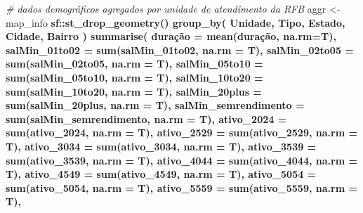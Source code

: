 \documentclass[]{article}
\newenvironment{Shaded}{\begin{snugshade}}{\end{snugshade}}
\newcommand{\CommentTok}[1]{\textcolor[rgb]{0.56,0.35,0.01}{\textit{#1}}}
\newcommand{\DataTypeTok}[1]{\textcolor[rgb]{0.13,0.29,0.53}{#1}}
\newcommand{\DecValTok}[1]{\textcolor[rgb]{0.00,0.00,0.81}{#1}}
\newcommand{\KeywordTok}[1]{\textcolor[rgb]{0.13,0.29,0.53}{\textbf{#1}}}
\newcommand{\NormalTok}[1]{#1}
\newcommand{\OperatorTok}[1]{\textcolor[rgb]{0.81,0.36,0.00}{\textbf{#1}}}
\newcommand{\StringTok}[1]{\textcolor[rgb]{0.31,0.60,0.02}{#1}}
\begin{document}
\begin{Shaded}
\begin{Highlighting}[]
\CommentTok{# dados demográficos agregados por unidade de atendimento da RFB }
\NormalTok{aggr <-}\StringTok{ }\NormalTok{map_info }\OperatorTok{%
\StringTok{          }\NormalTok{sf}\OperatorTok{::}\KeywordTok{st_drop_geometry}\NormalTok{() }\OperatorTok{%
\StringTok{          }\KeywordTok{group_by}\NormalTok{(}
\NormalTok{            Unidade, Tipo, Estado, Cidade, Bairro}
\NormalTok{          ) }\OperatorTok{%
\StringTok{          }\KeywordTok{summarise}\NormalTok{(}
\NormalTok{            duraçã}\DataTypeTok{o =} \KeywordTok{mean}\NormalTok{(duração, }\DataTypeTok{na.rm=}\NormalTok{T),}
            \DataTypeTok{salMin_01to02 =} \KeywordTok{sum}\NormalTok{(salMin_01to02, }\DataTypeTok{na.rm =}\NormalTok{ T),}
            \DataTypeTok{salMin_02to05 =} \KeywordTok{sum}\NormalTok{(salMin_02to05, }\DataTypeTok{na.rm =}\NormalTok{ T),}
            \DataTypeTok{salMin_05to10 =} \KeywordTok{sum}\NormalTok{(salMin_05to10, }\DataTypeTok{na.rm =}\NormalTok{ T),}
            \DataTypeTok{salMin_10to20 =} \KeywordTok{sum}\NormalTok{(salMin_10to20, }\DataTypeTok{na.rm =}\NormalTok{ T),}
            \DataTypeTok{salMin_20plus =} \KeywordTok{sum}\NormalTok{(salMin_20plus, }\DataTypeTok{na.rm =}\NormalTok{ T),}
            \DataTypeTok{salMin_semrendimento =} \KeywordTok{sum}\NormalTok{(salMin_semrendimento, }\DataTypeTok{na.rm =}\NormalTok{ T),}
            \DataTypeTok{ativo_2024 =} \KeywordTok{sum}\NormalTok{(ativo_}\DecValTok{2024}\NormalTok{, }\DataTypeTok{na.rm =}\NormalTok{ T),}
            \DataTypeTok{ativo_2529 =} \KeywordTok{sum}\NormalTok{(ativo_}\DecValTok{2529}\NormalTok{, }\DataTypeTok{na.rm =}\NormalTok{ T),}
            \DataTypeTok{ativo_3034 =} \KeywordTok{sum}\NormalTok{(ativo_}\DecValTok{3034}\NormalTok{, }\DataTypeTok{na.rm =}\NormalTok{ T),          }
            \DataTypeTok{ativo_3539 =} \KeywordTok{sum}\NormalTok{(ativo_}\DecValTok{3539}\NormalTok{, }\DataTypeTok{na.rm =}\NormalTok{ T),}
            \DataTypeTok{ativo_4044 =} \KeywordTok{sum}\NormalTok{(ativo_}\DecValTok{4044}\NormalTok{, }\DataTypeTok{na.rm =}\NormalTok{ T),}
            \DataTypeTok{ativo_4549 =} \KeywordTok{sum}\NormalTok{(ativo_}\DecValTok{4549}\NormalTok{, }\DataTypeTok{na.rm =}\NormalTok{ T),}
            \DataTypeTok{ativo_5054 =} \KeywordTok{sum}\NormalTok{(ativo_}\DecValTok{5054}\NormalTok{, }\DataTypeTok{na.rm =}\NormalTok{ T),}
            \DataTypeTok{ativo_5559 =} \KeywordTok{sum}\NormalTok{(ativo_}\DecValTok{5559}\NormalTok{, }\DataTypeTok{na.rm =}\NormalTok{ T),}
}}}
\end{Highlighting}
\end{Shaded}
\end{document}
